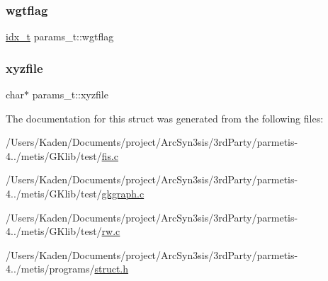 \mbox{\label{a00706_a31078d895c8f54dd2857e4faf1ba04f0}} 
\subsubsection{\texorpdfstring{wgtflag}{wgtflag}}
{\footnotesize\ttfamily \hyperlink{a00876_aaa5262be3e700770163401acb0150f52}{idx\+\_\+t} params\+\_\+t\+::wgtflag}

\mbox{\label{a00706_a7ee1145ed927b19de209aaa4562a5d9e}} 
\subsubsection{\texorpdfstring{xyzfile}{xyzfile}}
{\footnotesize\ttfamily char$\ast$ params\+\_\+t\+::xyzfile}



The documentation for this struct was generated from the following files\+:\begin{DoxyCompactItemize}
\item 
/\+Users/\+Kaden/\+Documents/project/\+Arc\+Syn3sis/3rd\+Party/parmetis-\/4../metis/\+G\+Klib/test/\hyperlink{a00146}{fis.\+c}\item 
/\+Users/\+Kaden/\+Documents/project/\+Arc\+Syn3sis/3rd\+Party/parmetis-\/4../metis/\+G\+Klib/test/\hyperlink{a00149}{gkgraph.\+c}\item 
/\+Users/\+Kaden/\+Documents/project/\+Arc\+Syn3sis/3rd\+Party/parmetis-\/4../metis/\+G\+Klib/test/\hyperlink{a00864}{rw.\+c}\item 
/\+Users/\+Kaden/\+Documents/project/\+Arc\+Syn3sis/3rd\+Party/parmetis-\/4../metis/programs/\hyperlink{a00975}{struct.\+h}\end{DoxyCompactItemize}
